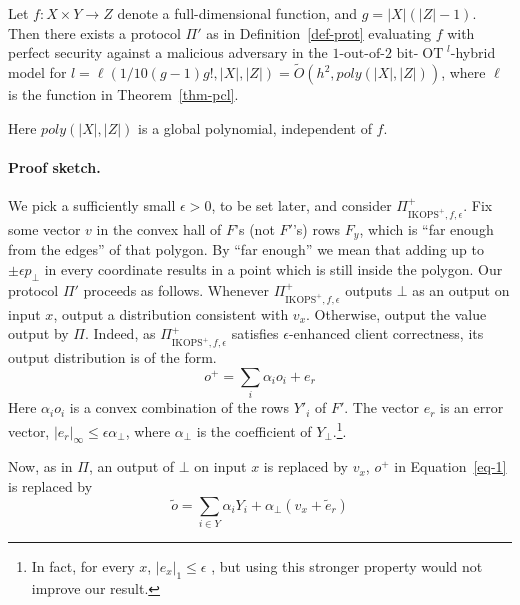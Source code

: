 \documentclass{llncs}
\newcommand{\atodo}[1]{\textcolor{purple}{TODO: #1}}
\newcommand{\OT}{\operatorname{OT}}
\newcommand{\bOT}[2]{#1\text{-out-of-}#2\text{ bit-}\OT}
\begin{document}
\begin{theorem}\label{thm-main}
Let $f:X\times Y\rightarrow Z$ denote a full-dimensional function, and
$g=|X|(|Z|-1)$.
Then there exists a protocol $\Pi'$ as in Definition~\ref{def-prot} evaluating $f$ with perfect security against a malicious adversary in the ${\bOT{1}{2}}^l$-hybrid model
for $l=\ell(1/10(g-1)g!, |X|, |Z|)=\tilde{O}(h^2,poly(|X|,|Z|))$, where $\ell$ is the function in Theorem~\ref{thm-pcl}.
 

Here $poly(|X|,|Z|)$ is a global polynomial, independent of $f$.%

\end{theorem}

\paragraph{Proof sketch.}

We pick a sufficiently small $\epsilon>0$, to be set later, and consider $\Pi^+_{\text{IKOPS}^+,f,\epsilon}$. Fix some vector $v$ in the convex hall of $F$'s (not $F'$'s) rows $F_y$, which is ``far enough from the edges'' of that polygon.
By ``far enough'' we mean that adding up to $\pm\epsilon p_\bot$ in every coordinate
results in a point which is still inside the polygon.
Our protocol $\Pi'$ proceeds as follows. Whenever $\Pi^+_{\text{IKOPS}^+,f,\epsilon}$ outputs $\bot$ as an output on input $x$, output  a distribution consistent with $v_x$. Otherwise, output the value output by $\Pi$. 
Indeed, as $\Pi^+_{\text{IKOPS}^+,f,\epsilon}$ satisfies $\epsilon$-enhanced client correctness, its output distribution 
is of the form.
\begin{equation}\label{eq-1}
o^+ = \sum_i\alpha_i o_i + e_r
\end{equation}
Here $\alpha_i o_i$ is a convex combination of the rows $Y'_i$ of $F'$.
The vector $e_r$ is an error vector, $|e_r|_\infty\leq \epsilon\alpha_\bot$, where $\alpha_\bot$ is the coefficient of $Y_\bot$.\footnote{In fact, for every $x$, $|e_x|_1\leq \epsilon$ , but using this stronger property would not improve our result.}.

Now, as in $\Pi$, an output of $\bot$ on input $x$ is replaced by $v_x$,
$o^+$ in Equation~\ref{eq-1} is replaced by
\begin{equation}
\tilde{o} = \sum_{i\in Y}\alpha_i Y_i + \alpha_\bot (v_x+\tilde{e}_r)
\end{equation}
\end{document}
